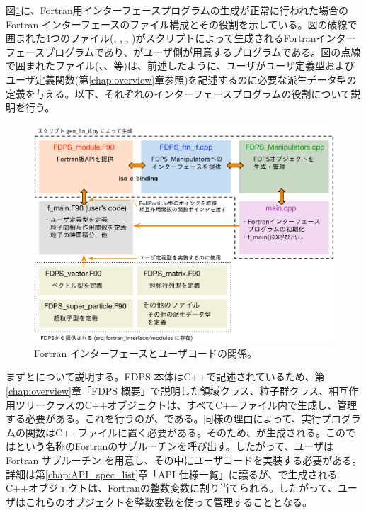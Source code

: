 図\ref{fig:FDPS_ftn_if_file_str}に、Fortran用インターフェースプログラムの生成が正常に行われた場合の Fortran インターフェースのファイル構成とその役割を示している。図の破線で囲まれた4つのファイル(, , , )がスクリプトによって生成されるFortranインターフェースプログラムであり、がユーザ側が用意するプログラムである。図の点線で囲まれたファイル(、、等)は、前述したように、ユーザがユーザ定義型およびユーザ定義関数(第\ref{chap:overview}章参照)を記述するのに必要な派生データ型の定義を与える。以下、それぞれのインターフェースプログラムの役割について説明を行う。

\begin{figure}[h]
\centering
\includegraphics[width=\linewidth]{./fig/FDPS_ftn_if_file_str.pdf}
\caption{Fortran インターフェースとユーザコードの関係。}
\label{fig:FDPS_ftn_if_file_str}
\end{figure}


まずとについて説明する。FDPS 本体はC++で記述されているため、第\ref{chap:overview}章「FDPS 概要」で説明した領域クラス、粒子群クラス、相互作用ツリークラスのC++オブジェクトは、すべてC++ファイル内で生成し、管理する必要がある。これを行うのが、である。同様の理由によって、実行プログラムの関数はC++ファイルに置く必要がある。そのため、が生成される。このではという名称のFortranのサブルーチンを呼び出す。したがって、ユーザはFortran サブルーチン を用意し、その中にユーザコードを実装する必要がある。詳細は第\ref{chap:API_spec_list}章「API 仕様一覧」に譲るが、で生成されるC++オブジェクトは、Fortranの整数変数に割り当てられる。したがって、ユーザはこれらのオブジェクトを整数変数を使って管理することとなる。

